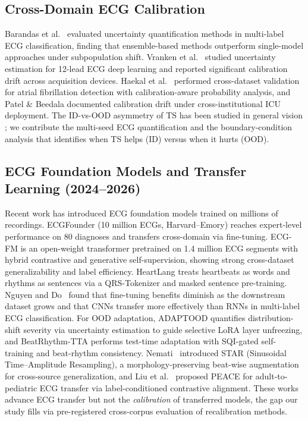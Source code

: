 \documentclass[review,12pt,nonatbib]{elsarticle}
\begin{document}
\subsection{Cross-Domain ECG Calibration}
Barandas et al.\ \cite{barandas2023} evaluated uncertainty
quantification methods in multi-label ECG classification, finding that
ensemble-based methods outperform single-model approaches under
subpopulation shift. Vranken et al.\ \cite{zhang2022} studied
uncertainty estimation for 12-lead ECG deep learning and reported
significant calibration drift across acquisition devices. Haekal et
al.\ \cite{physiolmeas2026} performed cross-dataset validation for
atrial fibrillation detection with calibration-aware probability
analysis, and Patel \& Beedala \cite{medrxiv2026} documented
calibration drift under cross-institutional ICU deployment. The
ID-vs-OOD asymmetry of TS has been studied in general vision
\cite{ovadia2019calibration}; we contribute the multi-seed ECG
quantification and the boundary-condition analysis that identifies
when TS helps (ID) versus when it hurts (OOD).

\subsection{ECG Foundation Models and Transfer Learning (2024--2026)}
Recent work has introduced ECG foundation models trained on millions
of recordings. ECGFounder \cite{ecgfounder2024,song2024ecgfm}
(10 million ECGs, Harvard--Emory) reaches expert-level performance on
80 diagnoses and transfers cross-domain via fine-tuning. ECG-FM
\cite{ecgfm2024} is an open-weight transformer pretrained on 1.4
million ECG segments with hybrid contrastive and generative
self-supervision, showing strong cross-dataset generalizability and
label efficiency. HeartLang \cite{heartlang2025} treats heartbeats as
words and rhythms as sentences via a QRS-Tokenizer and masked
sentence pre-training. Nguyen and Do\ \cite{transferecg2025} found that
fine-tuning benefits diminish as the downstream dataset grows and
that CNNs transfer more effectively than RNNs in multi-label ECG
classification. For OOD adaptation, ADAPTOOD \cite{adaptood2026}
quantifies distribution-shift severity via uncertainty estimation to
guide selective LoRA layer unfreezing, and BeatRhythm-TTA
\cite{beatrhythm2026} performs test-time adaptation with SQI-gated
self-training and beat-rhythm consistency. Nemati\
\cite{star2025} introduced STAR (Sinusoidal Time--Amplitude
Resampling), a morphology-preserving beat-wise augmentation for
cross-source generalization, and Liu et al.\ \cite{peace2026}
proposed PEACE for adult-to-pediatric ECG transfer via
label-conditioned contrastive alignment. These works advance ECG
transfer but not the \emph{calibration} of transferred models, the
gap our study fills via pre-registered cross-corpus evaluation of
recalibration methods.
\end{document}
